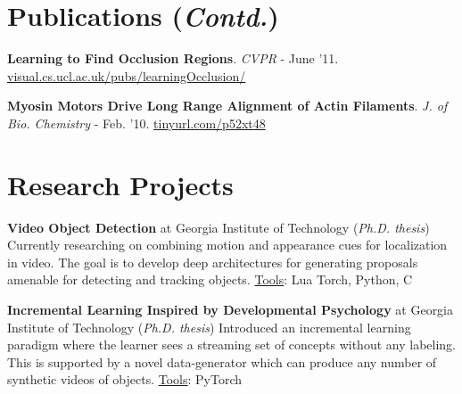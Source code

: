 \documentclass[10pt,twoside,a4paper]{article}
\newif\ifdetail
\newcommand\CPP{C\nolinebreak[4]\hspace{-.05em}\raisebox{.4ex}{\relsize{-3}{\textbf{++}}}}
\begin{document}
\section{Publications {\small(\textit{Contd.})}}
{
\small
\fi

\ifdetail
\textbf{Towards Protein Network Analysis Using TIS Imaging and Exploratory Data Analysis}. ($3^{\text{rd}}$ author) \newline \textit{Workshop on Computational Systems Biology (WCSB)} - June '11. \href{http://ahumayun.com/pubs/langenkamper_WCSB_2011_tisdataanalysis.pdf}{ahumayun.com/pubs/tisdata11} %
\fi

\textbf{Learning to Find Occlusion Regions}. \ifdetail ($1^{\text{st}}$ author) \newline \fi \textit{\ifdetail IEEE Conference on Computer Vision and Pattern Recognition (CVPR) \else CVPR \fi} - June '11. \href{http://visual.cs.ucl.ac.uk/pubs/learningOcclusion/}{visual.cs.ucl.ac.uk/pubs/learningOcclusion/}

\textbf{Myosin Motors Drive Long Range Alignment of Actin Filaments}. \ifdetail ($3^{\text{rd}}$ author) \newline \fi \textit{\ifdetail Journal of Biological Chemistry \else J. of Bio. Chemistry \fi} - Feb. '10. \href{http://www.jbc.org/content/285/7/4964.abstract}{\ifdetail www.jbc.org/content/285/7/4964.abstract \else tinyurl.com/p52xt48 \fi}
}

\ifdetail
\else
\vspace{-0.4cm}
\fi


\section{Research Projects}
\textbf{Video Object Detection} at Georgia Institute of Technology (\textit{Ph.D. thesis}) \newline
Currently researching on combining motion and appearance cues for localization in video. The goal is to develop deep architectures for generating proposals amenable for detecting and tracking objects. \underline{Tools}: Lua Torch, Python, \CPP

\textbf{Incremental Learning Inspired by Developmental Psychology} at Georgia Institute of Technology (\textit{Ph.D. thesis}) \newline
Introduced an incremental learning paradigm where the learner sees a streaming set of concepts without any labeling. This is supported by a novel data-generator which can produce any number of synthetic videos of objects. \underline{Tools}: PyTorch
\end{document}
